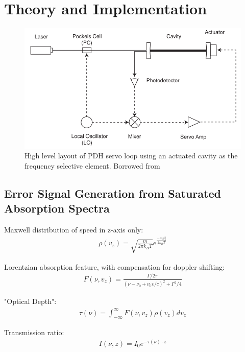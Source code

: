 \newpage
\section{Theory and Implementation} \label{sec:theory}

\begin{figure}[!hrt]
  \centering
  \label{cavity_eom_pdh}
  \includegraphics[scale=0.5]{cavity_eom_pdh.png}
  \caption{High level layout of PDH servo loop using an actuated cavity as
  the frequency selective element. Borrowed from \cite{black1998}}
\end{figure}


\subsection{Error Signal Generation from Saturated Absorption Spectra}
Maxwell distribution of speed in z-axis only:
\begin{gather}
  \rho(v_z) = \sqrt{\frac{m}{2\pi k_B T}} e^{\frac{-m v_z^2}{2k_B T}}
\end{gather}

Lorentzian absorption feature, with compensation for doppler shifting:
\begin{gather}
  F(\nu, v_z) = \frac{\Gamma / 2 \pi}{(\nu - \nu_0 + \nu_0 v / c)^2 +
  \Gamma^2 / 4}
\end{gather}

"Optical Depth":
\begin{gather}
  \tau(\nu) = \int_{-\infty}^\infty F(\nu, v_z) \rho(v_z) dv_z
\end{gather}

Transmission ratio:
\begin{gather}
  I(\nu, z) = I_0 e^{-\tau(\nu)\cdot z}
\end{gather}

